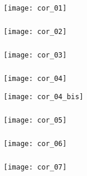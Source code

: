 \fi
\ifprof
\newpage

\setcounter{exo}{0}

\subparagraph{}
\begin{center}
\texttt{[image: cor\_01]}
\end{center}

\subparagraph{}
\begin{center}
\texttt{[image: cor\_02]}
\end{center}

\subparagraph{}
\begin{center}
\texttt{[image: cor\_03]}
\end{center}

\subparagraph{}
\begin{center}
\texttt{[image: cor\_04]}

\texttt{[image: cor\_04\_bis]}
\end{center}

\subparagraph{}
\begin{center}
\texttt{[image: cor\_05]}
\end{center}

\subparagraph{}
\begin{center}
\texttt{[image: cor\_06]}
\end{center}

\subparagraph{}
\begin{center}
\texttt{[image: cor\_07]}
\end{center}
%
%
%
%

\else
\fi
